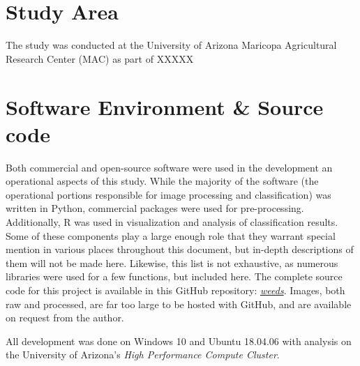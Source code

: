 \documentclass[letterpaper]{article}
\begin{document}
\section {Study Area}
The study was conducted at the University of Arizona Maricopa Agricultural Research Center (MAC)  as part of XXXXX

\section{Software Environment \& Source code}
Both commercial and open-source software were used in the development an operational aspects of this study. While the majority of the software (the operational portions responsible for image processing and classification) was written in Python, commercial packages were used for pre-processing. Additionally, R was used in visualization and analysis of classification results. Some of these components play a large enough role that they warrant special mention in various places throughout this document, but in-depth descriptions of them will not be made here. Likewise, this list is not exhaustive, as numerous libraries were used for a few functions, but included here. The complete source code for this project is available in this GitHub repository: \href{https://github.com/evan-mcginnis/weeds}{\textit {weeds}}. Images, both raw and processed, are far too large to be hosted with GitHub, and are available on request from the author.

All development was done on Windows 10 and Ubuntu 18.04.06 with analysis on the University of Arizona's \textit{High Performance Compute Cluster}.
\end{document}
